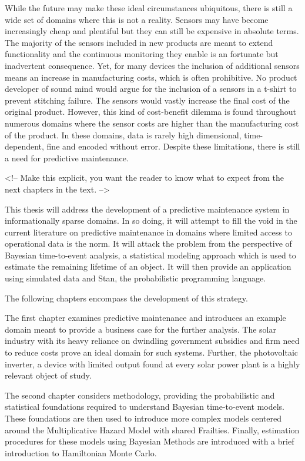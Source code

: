 While the future may make these ideal circumstances ubiquitous, there is still a wide set of domains where this is not a reality. Sensors may have become increasingly cheap and plentiful but they can still be expensive in absolute terms. The majority of the sensors included in new products are meant to extend functionality and the continuous monitoring they enable is an fortunate but inadvertent consequence. Yet, for many devices the inclusion of additional sensors means an increase in manufacturing costs, which is often prohibitive. No product developer of sound mind would argue for the inclusion of a sensors in a t-shirt to prevent stitching failure. The sensors would vastly increase the final cost of the original product. However, this kind of cost-benefit dilemma is found throughout numerous domains where the sensor costs are higher than the manufacturing cost of the product. In these domains, data is rarely high dimensional, time-dependent, fine and encoded without error. Despite these limitations, there is still a need for predictive maintenance. 

<!-- Make this explicit, you want the reader to know what to expect from the next chapters in the text. -->

This thesis will address the development of a predictive maintenance system in informationally sparse domains. In so doing, it will attempt to fill the void in the current literature on predictive maintenance in domains where limited access to operational data is the norm. It will attack the problem from the perspective of Bayesian time-to-event analysis, a statistical modeling approach which is used to estimate the remaining lifetime of an object. It will then provide an application using simulated data and Stan, the probabilistic programming language.

The following chapters encompass the development of this strategy. 

The first chapter examines predictive maintenance and introduces an example domain meant to provide a business case for the further analysis. The solar industry with its heavy reliance on dwindling government subsidies and firm need to reduce costs prove an ideal domain for such systems. Further, the photovoltaic inverter, a device with limited output found at every solar power plant is a highly relevant object of study. 

The second chapter considers methodology, providing the probabilistic and statistical foundations required to understand Bayesian time-to-event models. These foundations are then used to introduce more complex models centered around the Multiplicative Hazard Model with shared Frailties. Finally, estimation procedures for these models using Bayesian Methods are introduced with a brief introduction to Hamiltonian Monte Carlo. 

